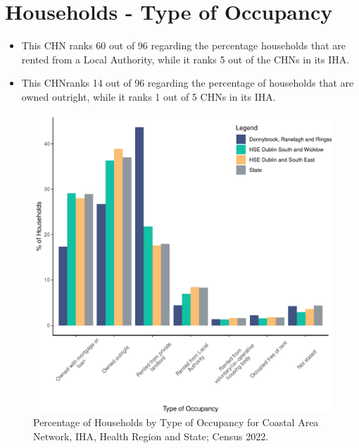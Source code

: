 \documentclass{article}
\begin{document}
\section{Households - Type of Occupancy}\label{sect:Households}
\begin{itemize}
\item This CHN ranks  60 out of 96 regarding the percentage households that are rented from a Local Authority, while it ranks  5 out of the CHNs in its IHA. 
\item This CHNranks  14 out of 96 regarding the percentage of households that are owned outright, while it ranks   1 out of 5 CHNs in its IHA.
\end{itemize}
\begin{figure}[H]
	\centering
	\includegraphics[width = 140mm]{../figures/HouseholdsED.pdf}
	\caption{Percentage of Households by Type of Occupancy for Coastal Area Network, IHA, Health Region and State; Census 2022.}
	\label{fig:vbnv}
	\end{figure}
\end{document}
